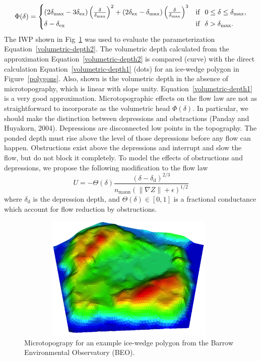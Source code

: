\documentclass[review,11pt]{elsarticle}
\begin{document}
\begin{equation}\label{volumetric-depth2}
\Phi (\delta) =
\begin{cases} (2 \delta_\text{max} - 3 \delta_\text{ex}) \left(\frac{\delta}{\delta_\text{max}} \right )^2 + (2 \delta_\text{ex} -  \delta_\text{max}) \left(\frac{\delta}{\delta_\text{max}} \right )^3 & \text{if} \hskip 0.1in 0 \leq \delta \leq \delta_\text{max}, \\
\delta - \delta_\text{ex} & \text{if} \hskip .1in \delta > \delta_\text{max}.
\end{cases}
\end{equation}
The IWP shown in Fig~\ref{3Dpolygon40} was used to evaluate the parameterization Equation~\ref{volumetric-depth2}. The volumetric depth calculated from the approximation Equation~\ref{volumetric-depth2} is compared (curve) with the direct calculation Equation~\ref{volumetric-depth1} (dots) for an ice-wedge polygon in Figure~\ref{polygons}. Also, shown is the volumetric depth in the absence of microtopography, which is linear with slope unity. Equation~\ref{volumetric-depth1} is a very good approximation.
Microtopographic effects on the flow law are not as straightforward to incorporate as the volumetric head $\Phi(\delta)$. In particular, we should make the distinction between depressions and obstractions (Panday and Huyakorn, 2004). Depressions are disconnected low points in the topography. The ponded depth must rise above the level of those depressions before any flow can happen. Obstructions exist above the depressions and interrupt and slow the flow, but do not block it completely.
To model the effects of obstructions and depressions, we propose the following modification to the flow law
\begin{equation}
U = - \Theta(\delta) \frac{(\delta - \delta_\text{d})^{2/3}}{n_\text{mann} (\| \nabla Z \| +\epsilon)^{1/2}}
\end{equation}
where $\delta_\text{d}$ is the depression depth, and $\Theta(\delta) \in [0,1]$ is a fractional conductance which account for flow reduction by obstructions.

\begin{figure}
\centering
\includegraphics[width=11cm, height=6cm]{./figures/3DPolygonsImages/3Dpolygon40.png}
\caption{Microtopograpy for an example ice-wedge polygon from the Barrow Environmental Observatory (BEO).}
\label{3Dpolygon40}
\end{figure}
\end{document}
